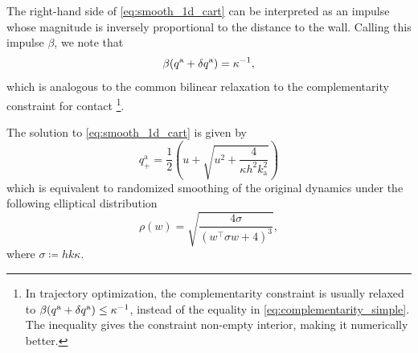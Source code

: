 \begin{example}
The right-hand side of \eqref{eq:smooth_1d_cart} can be interpreted as an impulse whose magnitude is inversely proportional to the distance to the wall. Calling this impulse $\beta$, we note that
\begin{equation}
\label{eq:complementarity_simple}
    \beta ({q^\mathrm{a}} + {\delta q^\mathrm{a}}) = \kappa^{-1},
\end{equation}
which is analogous to the common bilinear relaxation to the complementarity constraint for contact \cite{posa2014direct, howell2022dojo}\footnote{
In trajectory optimization, the complementarity constraint is usually relaxed to $\beta ({q^\mathrm{a}} + {\delta q^\mathrm{a}}) \leq \kappa^{-1}$, instead of the equality in \eqref{eq:complementarity_simple}. The inequality gives the constraint non-empty interior, making it numerically better.
}.

The solution to \eqref{eq:smooth_1d_cart} is given by 
\begin{equation}
    q^\mathrm{a}_+=\frac{1}{2}\left(u + \sqrt{u^2 + \frac{4}{\kappa h^2k^2_\mathrm{a}}}\right)
\end{equation}
which is equivalent to randomized smoothing of the original dynamics under the following elliptical distribution
\begin{equation}
    \rho(w) = \sqrt{\frac{4\sigma }{(w^\intercal\sigma w + 4)^3}},
\end{equation}
where $\sigma\coloneqq hk\kappa $.
\end{example}


